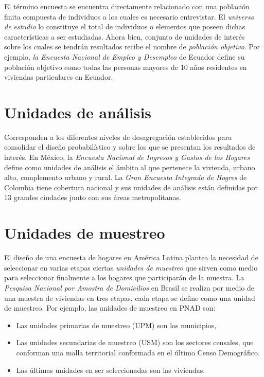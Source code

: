 \documentclass[
  12pt,
]{book}
\providecommand{\tightlist}{%
  \setlength{\itemsep}{0pt}\setlength{\parskip}{0pt}}
\begin{document}
El término encuesta se encuentra directamente relacionado con una población finita compuesta de individuos a los cuales es necesario entrevistar. El \emph{universo de estudio} lo constituye el total de individuos o elementos que poseen dichas características a ser estudiadas. Ahora bien, conjunto de unidades de interés sobre los cuales se tendrán resultados recibe el nombre de \emph{población objetivo}. Por ejemplo, \emph{la Encuesta Nacional de Empleo y Desempleo} de Ecuador define su población objetivo como todas las personas mayores de 10 años residentes en viviendas particulares en Ecuador.

\hypertarget{unidades-de-anuxe1lisis}{%
\section{Unidades de análisis}\label{unidades-de-anuxe1lisis}}

Corresponden a los diferentes niveles de desagregación establecidos para consolidar el diseño probabilístico y sobre los que se presentan los resultados de interés. En México, la \emph{Encuesta Nacional de Ingresos y Gastos de los Hogares} define como unidades de análisis el ámbito al que pertenece la vivienda, urbano alto, complemento urbano y rural. La \emph{Gran Encuesta Integrada de Hogres} de Colombia tiene cobertura nacional y sus unidades de análisis están definidas por 13 grandes ciudades junto con sus áreas metropolitanas.

\hypertarget{unidades-de-muestreo}{%
\section{Unidades de muestreo}\label{unidades-de-muestreo}}

El diseño de una encuesta de hogares en América Latina plantea la necesidad de seleccionar en varias etapas ciertas \emph{unidades de muestreo} que sirven como medio para seleccionar finalmente a los hogares que participarán de la muestra. La \emph{Pesquisa Nacional por Amostra de Domicilios} en Brasil se realiza por medio de una muestra de viviendas en tres etapas, cada etapa se define como una unidad de muestreo. Por ejemplo, las unidades de muestreo en PNAD son:

\begin{itemize}
\tightlist
\item
  Las unidades primarias de muestreo (UPM) son los municipios,
\item
  Las unidades secundarias de muestreo (USM) son los sectores censales, que conforman una malla territorial conformada en el último Censo Demográfico.
\item
  Las últimas unidades en ser seleccionadas son las viviendas.
\end{itemize}
\end{document}
